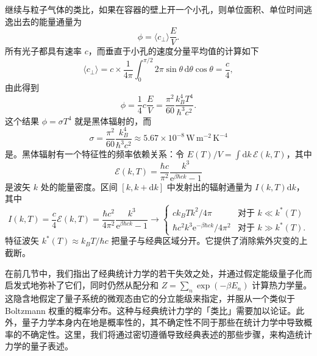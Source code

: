 继续与粒子气体的类比，如果在容器的壁上开一个小孔，则单位面积、单位时间逃逸出去的能量通量为
\begin{equation}\label{eq:6.56}
\phi=\langle c_\perp\rangle\frac EV.
\end{equation}
所有光子都具有速率 $c$，而垂直于小孔的速度分量平均值的计算如下
\begin{equation}\label{eq:6.57}
\langle c_\perp\rangle=c\times\frac1{4\pi}\int_0^{\pi/2}2\pi\sin\theta\,\mathrm d\theta\cos\theta=\frac c4,
\end{equation}
由此得到
\begin{equation}\label{eq:6.58}
\phi=\frac14c\frac EV=\frac{\pi^2}{60}\frac{k_B^4T^4}{\hbar^3c^2}.
\end{equation}
这个结果 $\phi=\sigma T^4$ 就是黑体辐射的，而
\begin{equation}\label{eq:6.59}
\sigma=\frac{\pi^2}{60}\frac{k_B^4}{\hbar^3c^2}\approx5.67\times10^{-8}\,\mathrm{W\,m^{-2}\,K^{-4}}
\end{equation}
是。黑体辐射有一个特征性的频率依赖关系：令 $E(T)/V=\int\mathrm dk\,\mathcal E(k,T)$，其中
\begin{equation}\label{eq:6.60}
\mathcal E(k,T)=\frac{\hbar c}{\pi^2}\frac{k^3}{\mathrm e^{\beta\hbar ck}-1}
\end{equation}
是波矢 $k$ 处的能量密度。区间 $[k,k+\mathrm dk]$ 中发射出的辐射通量为 $I(k,T)\mathrm dk$，其中
\begin{equation}\label{eq:6.61}
I(k,T)=\frac c4\mathcal E(k,T)=\frac{\hbar c^2}{4\pi^2}\frac{k^3}{\mathrm e^{\beta\hbar ck}-1}\to\begin{cases}ck_BTk^2/4\pi&\text{对于 }k\ll k^*(T)\\[2pt]\hbar c^2k^3\mathrm e^{-\beta\hbar ck}/4\pi^2&\text{对于 }k\gg k^*(T).\end{cases}
\end{equation}
特征波矢 $k^*(T)\approx k_BT/\hbar c$ 把量子与经典区域分开。它提供了消除紫外灾变的上截断。




在前几节中，我们指出了经典统计力学的若干失效之处，并通过假定能级量子化而启发式地弥补了它们，同时仍然从配分和 $Z=\sum_n\exp(-\beta E_n)$ 计算热力学量。这隐含地假定了量子系统的微观态由它的分立能级来指定，并服从一个类似于 Boltzmann 权重的概率分布。这种与经典统计力学的「类比」需要加以论证。此外，量子力学本身内在地是概率性的，其不确定性不同于那些在统计力学中导致概率的不确定性。这里，我们将通过密切遵循导致经典表述的那些步骤，来构造统计力学的量子表述。

